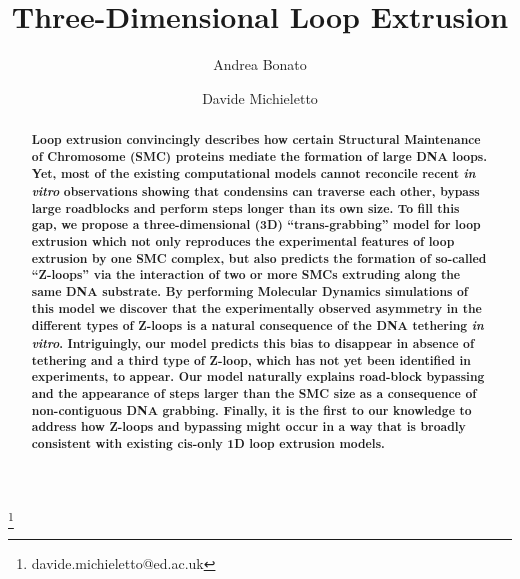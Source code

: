 \documentclass[aps,prl,twocolumn,a4paper,10pt,notitlepage,footinbib,nobalancelastpage,superscriptaddress,showpacs,floatfix]{revtex4-1}%
\begin{document}
\title{Three-Dimensional Loop Extrusion}

\author{Andrea Bonato}
\address{University of Edinburgh, SUPA, School of Physics and Astronomy, Peter Guthrie Road, EH9 3FD, Edinburgh, UK }

\author{Davide Michieletto}
\thanks{davide.michieletto@ed.ac.uk}


\begin{abstract}
\textbf{Loop extrusion convincingly describes how certain Structural Maintenance of Chromosome (SMC) proteins mediate the formation of large DNA loops. Yet, most of the existing computational models cannot reconcile recent \emph{in vitro} observations showing that condensins can traverse each other, bypass large roadblocks and perform steps longer than its own size.  To fill this gap, we propose a three-dimensional (3D) ``trans-grabbing'' model for loop extrusion which not only reproduces the experimental features of loop extrusion by one SMC complex, but also predicts the formation of so-called ``Z-loops'' via the interaction of two or more SMCs extruding along the same DNA substrate. By performing Molecular Dynamics simulations of this model we discover that the experimentally observed asymmetry in the different types of Z-loops is a natural consequence of the DNA tethering \emph{in vitro}. Intriguingly, our model predicts this bias to disappear in absence of tethering and a third type of Z-loop, which has not yet been identified in experiments, to appear. Our model naturally explains road-block bypassing and the appearance of steps larger than the SMC size as a consequence of non-contiguous DNA grabbing. Finally, it is the first to our knowledge to address how Z-loops and bypassing might occur in a way that is broadly consistent with existing cis-only 1D loop extrusion models.
 }
\end{abstract}


\maketitle
	
\end{document}
